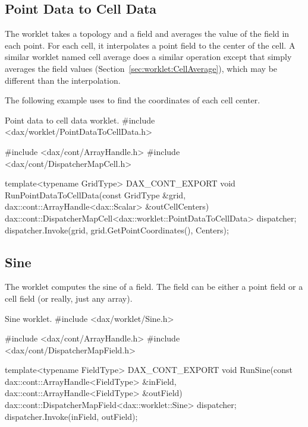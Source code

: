 \subsection{Point Data to Cell Data}
\label{sec:worklet:PointDataToCellData}

The  worklet takes a topology and a field
and averages the value of the field in each point. For each cell, it
interpolates a point field to the center of the cell. A similar worklet
named cell average does a similar operation except that simply averages the
field values (Section~\ref{sec:worklet:CellAverage}), which may be
different than the interpolation.

The following example uses  to find the
coordinates of each cell center.

\begin{daxexample}{Point data to cell data worklet.}
#include <dax/worklet/PointDataToCellData.h>

#include <dax/cont/ArrayHandle.h>
#include <dax/cont/DispatcherMapCell.h>

template<typename GridType>
DAX_CONT_EXPORT
void RunPointDataToCellData(const GridType &grid,
                            dax::cont::ArrayHandle<dax::Scalar> &outCellCenters)
{
  dax::cont::DispatcherMapCell<dax::worklet::PointDataToCellData> dispatcher;
  dispatcher.Invoke(grid, grid.GetPointCoordinates(), Centers);
}
\end{daxexample}

\subsection{Sine}

The  worklet computes the sine of a field. The field
can be either a point field or a cell field (or really, just any array).

\begin{daxexample}{Sine worklet.}
#include <dax/worklet/Sine.h>

#include <dax/cont/ArrayHandle.h>
#include <dax/cont/DispatcherMapField.h>

template<typename FieldType>
DAX_CONT_EXPORT
void RunSine(const dax::cont::ArrayHandle<FieldType> &inField,
             dax::cont::ArrayHandle<FieldType> &outField)
{
  dax::cont::DispatcherMapField<dax::worklet::Sine> dispatcher;
  dispatcher.Invoke(inField, outField);
}
\end{daxexample}

